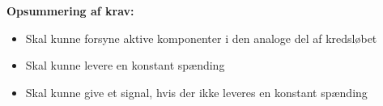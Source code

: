 \vspace{3mm}
\textbf{Opsummering af krav:}
\begin{itemize} 
\item[\text{\sffamily \checkmark}] Skal kunne forsyne aktive komponenter i den analoge del af kredsløbet
\item[\text{\sffamily \checkmark}] Skal kunne levere en konstant spænding
\item[\text{\sffamily \checkmark}] Skal kunne give et signal, hvis der ikke leveres en konstant spænding
\end{itemize}

